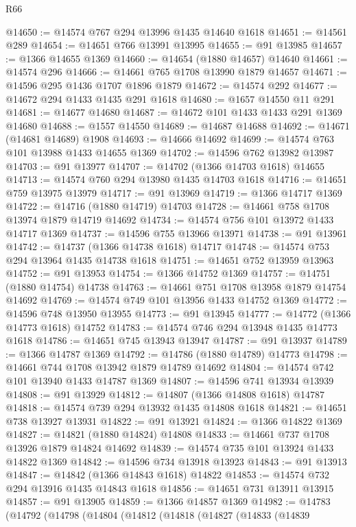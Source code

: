 \begin{lexlean}{R66}
\begin{coremodule}
@14650 := @14574 @767 @294 @13996 @1435 @14640 @1618
@14651 := @14561 @289
@14654 := @14651 @766 @13991 @13995
@14655 := @91 @13985
@14657 := @1366 @14655 @1369
@14660 := @14654 (@1880 @14657) @14640
@14661 := @14574 @296
@14666 := @14661 @765 @1708 @13990 @1879 @14657
@14671 := @14596 @295 @1436 @1707 @1896 @1879
@14672 := @14574 @292
@14677 := @14672 @294 @1433 @1435 @291 @1618
@14680 := @1657 @14550 @11 @291
@14681 := @14677 @14680
@14687 := @14672 @101 @1433 @1433 @291 @1369 @14680
@14688 := @1557 @14550
@14689 := @14687 @14688
@14692 := @14671 (@14681 @14689) @1908
@14693 := @14666 @14692
@14699 := @14574 @763 @101 @13988 @1433 @14655 @1369
@14702 := @14596 @762 @13982 @13987
@14703 := @91 @13977
@14707 := @14702 (@1366 @14703 @1618) @14655
@14713 := @14574 @760 @294 @13980 @1435 @14703 @1618
@14716 := @14651 @759 @13975 @13979
@14717 := @91 @13969
@14719 := @1366 @14717 @1369
@14722 := @14716 (@1880 @14719) @14703
@14728 := @14661 @758 @1708 @13974 @1879 @14719 @14692
@14734 := @14574 @756 @101 @13972 @1433 @14717 @1369
@14737 := @14596 @755 @13966 @13971
@14738 := @91 @13961
@14742 := @14737 (@1366 @14738 @1618) @14717
@14748 := @14574 @753 @294 @13964 @1435 @14738 @1618
@14751 := @14651 @752 @13959 @13963
@14752 := @91 @13953
@14754 := @1366 @14752 @1369
@14757 := @14751 (@1880 @14754) @14738
@14763 := @14661 @751 @1708 @13958 @1879 @14754 @14692
@14769 := @14574 @749 @101 @13956 @1433 @14752 @1369
@14772 := @14596 @748 @13950 @13955
@14773 := @91 @13945
@14777 := @14772 (@1366 @14773 @1618) @14752
@14783 := @14574 @746 @294 @13948 @1435 @14773 @1618
@14786 := @14651 @745 @13943 @13947
@14787 := @91 @13937
@14789 := @1366 @14787 @1369
@14792 := @14786 (@1880 @14789) @14773
@14798 := @14661 @744 @1708 @13942 @1879 @14789 @14692
@14804 := @14574 @742 @101 @13940 @1433 @14787 @1369
@14807 := @14596 @741 @13934 @13939
@14808 := @91 @13929
@14812 := @14807 (@1366 @14808 @1618) @14787
@14818 := @14574 @739 @294 @13932 @1435 @14808 @1618
@14821 := @14651 @738 @13927 @13931
@14822 := @91 @13921
@14824 := @1366 @14822 @1369
@14827 := @14821 (@1880 @14824) @14808
@14833 := @14661 @737 @1708 @13926 @1879 @14824 @14692
@14839 := @14574 @735 @101 @13924 @1433 @14822 @1369
@14842 := @14596 @734 @13918 @13923
@14843 := @91 @13913
@14847 := @14842 (@1366 @14843 @1618) @14822
@14853 := @14574 @732 @294 @13916 @1435 @14843 @1618
@14856 := @14651 @731 @13911 @13915
@14857 := @91 @13905
@14859 := @1366 @14857 @1369
@14982 := @14783
    (@14792
      (@14798
        (@14804
          (@14812
            (@14818
              (@14827
                (@14833
                  (@14839

\end{coremodule}
\end{lexlean}
